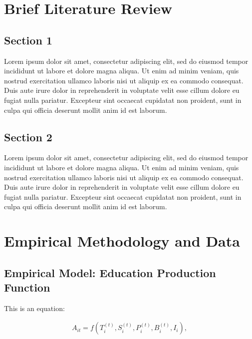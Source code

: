 \documentclass[12pt,preprint, authoryear]{article}
\numberwithin{equation}{section}
\numberwithin{figure}{section}
\numberwithin{table}{section}
\begin{document}
\section{\texorpdfstring{Brief Literature Review
\label{Lit}}{Brief Literature Review }}\label{brief-literature-review}

\subsection{Section 1}\label{section-1}

Lorem ipsum dolor sit amet, consectetur adipiscing elit, sed do eiusmod
tempor incididunt ut labore et dolore magna aliqua. Ut enim ad minim
veniam, quis nostrud exercitation ullamco laboris nisi ut aliquip ex ea
commodo consequat. Duis aute irure dolor in reprehenderit in voluptate
velit esse cillum dolore eu fugiat nulla pariatur. Excepteur sint
occaecat cupidatat non proident, sunt in culpa qui officia deserunt
mollit anim id est laborum.

\subsection{Section 2}\label{section-2}

Lorem ipsum dolor sit amet, consectetur adipiscing elit, sed do eiusmod
tempor incididunt ut labore et dolore magna aliqua. Ut enim ad minim
veniam, quis nostrud exercitation ullamco laboris nisi ut aliquip ex ea
commodo consequat. Duis aute irure dolor in reprehenderit in voluptate
velit esse cillum dolore eu fugiat nulla pariatur. Excepteur sint
occaecat cupidatat non proident, sunt in culpa qui officia deserunt
mollit anim id est laborum.

\section{\texorpdfstring{Empirical Methodology and Data
\label{Data}}{Empirical Methodology and Data }}\label{empirical-methodology-and-data}

\subsection{\texorpdfstring{Empirical Model: Education Production
Function
\label{Model}}{Empirical Model: Education Production Function }}\label{empirical-model-education-production-function}

This is an equation:

\begin{align} \label{eq:EP1}
A_{it}=f(T_i^{(t)},S_i^{(t)},P_i^{(t)},B_i^{(t)},I_i),
\end{align}
\end{document}
